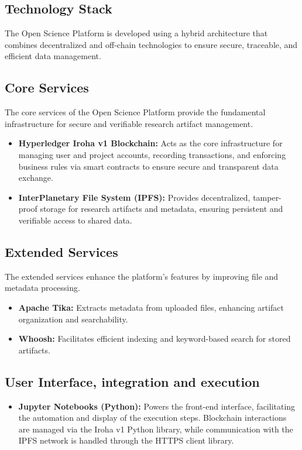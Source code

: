 \documentclass{article}
\begin{document}
\subsection{Technology Stack}
The Open Science Platform is developed using a hybrid architecture that combines decentralized and off-chain technologies to ensure secure, traceable, and efficient data management.

\subsection{Core Services}

The core services of the Open Science Platform provide the fundamental infrastructure for secure and verifiable research artifact management.

\begin{itemize}
    \item \textbf{Hyperledger Iroha v1 Blockchain:} Acts as the core infrastructure for managing user and project accounts, recording transactions, and enforcing business rules via smart contracts to ensure secure and transparent data exchange.
    \item \textbf{InterPlanetary File System (IPFS):} Provides decentralized, tamper-proof storage for research artifacts and metadata, ensuring persistent and verifiable access to shared data.
\end{itemize}

\subsection{Extended Services}

The extended services enhance the platform's features by improving file and metadata processing.

\begin{itemize}
    \item \textbf{Apache Tika:} Extracts metadata from uploaded files, enhancing artifact organization and searchability.
    \item \textbf{Whoosh:} Facilitates efficient indexing and keyword-based search for stored artifacts.
\end{itemize}


\subsection{User Interface, integration and execution}

\begin{itemize}
    \item \textbf{Jupyter Notebooks (Python):} Powers the front-end interface, facilitating the automation and display of the execution steps. Blockchain interactions are managed via the Iroha v1 Python library, while communication with the IPFS network is handled through the HTTPS client library.
\end{itemize}
\end{document}

